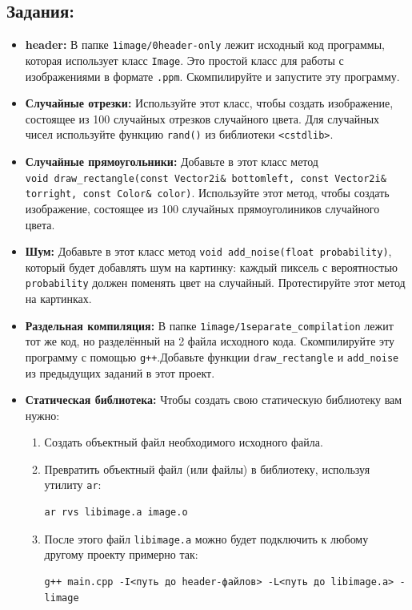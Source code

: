\documentclass{article}
\begin{document}
\subsection*{Задания:}
\begin{itemize}
\item \textbf{header:} В папке \texttt{1image/0header-only} лежит исходный код программы, которая использует класс \texttt{Image}. Это простой класс для работы с изображениями в формате \texttt{.ppm}. Скомпилируйте и запустите эту программу.
\item \textbf{Случайные отрезки:} Используйте этот класс, чтобы создать изображение, состоящее из 100 случайных отрезков случайного цвета. Для случайных чисел используйте функцию \texttt{rand()} из библиотеки \texttt{<cstdlib>}.
\item \textbf{Случайные прямоугольники:} Добавьте в этот класс метод \\
\texttt{void draw\_rectangle(const Vector2i\& bottomleft, const Vector2i\& torright, const Color\& color)}. Используйте этот метод, чтобы создать изображение, состоящее из 100 случайных прямоуголиников случайного цвета.
\item \textbf{Шум:} Добавьте в этот класс метод \texttt{void add\_noise(float probability)}, который будет добавлять шум на картинку: каждый пиксель с вероятностью \texttt{probability} должен поменять цвет на случайный. Протестируйте этот метод на картинках.
\item \textbf{Раздельная компиляция:} В папке \texttt{1image/1separate\_compilation} лежит тот же код, но разделённый на 2 файла исходного кода. Скомпилируйте эту программу с помощью \texttt{g++}.Добавьте функции \texttt{draw\_rectangle} и \texttt{add\_noise} из предыдущих заданий в этот проект.
\item \textbf{Статическая библиотека:} Чтобы создать свою статическую библиотеку вам нужно:
\begin{enumerate}
\item Создать объектный файл необходимого исходного файла.
\item Превратить объектный файл (или файлы) в библиотеку, используя утилиту \texttt{ar}:
\begin{verbatim}
ar rvs libimage.a image.o
\end{verbatim}
\item После этого файл \texttt{libimage.a} можно будет подключить к любому другому проекту примерно так:
\begin{verbatim}
g++ main.cpp -I<путь до header-файлов> -L<путь до libimage.a> -limage

\end{verbatim}
\end{enumerate}
\end{itemize}
\end{document}
